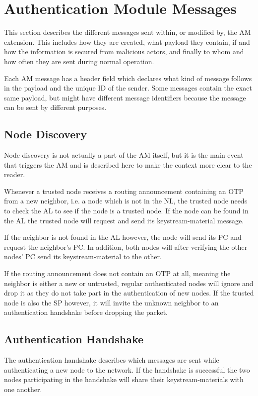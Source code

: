 \section{Authentication Module Messages}
\label{sect:am_messages}
This section describes the different messages sent within, or modified by, the
\ac{AM} extension. This includes how they are created, what payload they
contain, if and how the information is secured from malicious actors, and
finally to whom and how often they are sent during normal operation.

Each \ac{AM} message has a header field which declares what kind of message
follows in the payload and the unique ID of the sender. Some messages contain
the exact same payload, but might have different message identifiers because the
message can be sent by different purposes.

\subsection{Node Discovery}
Node discovery is not actually a part of the \ac{AM} itself, but it is the
main event that triggers the \ac{AM} and is described here to make the context
more clear to the reader.

Whenever a trusted node receives a routing announcement containing an \acf{OTP}
from a new neighbor, i.e. a node which is not in the \acf{NL}, the trusted node
needs to check the \acf{AL} to see if the node is a trusted node. If the node
can be found in the \ac{AL} the trusted node will request and send its
keystream-material message.

If the neighbor is not found in the \ac{AL} however, the node will send its
\ac{PC} and request the neighbor's \ac{PC}. In addition, both nodes will after
verifying the other nodes' \ac{PC} send its keystream-material to the other.

If the routing announcement does not contain an \ac{OTP} at all, meaning the
neighbor is either a new or untrusted, regular authenticated nodes will ignore
and drop it as they do not take part in the authentication of new nodes. If the
trusted node is also the \acf{SP} however, it will invite the unknown neighbor
to an authentication handshake before dropping the packet.

\subsection{Authentication Handshake}
The authentication handshake describes which messages are sent while
authenticating a new node to the network. If the handshake is successful the two
nodes participating in the handshake will share their keystream-materials with
one another.

